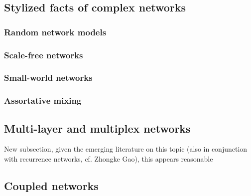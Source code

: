 	\subsection{Stylized facts of complex networks}
		\subsubsection{Random network models}
		\subsubsection{Scale-free networks}
		\subsubsection{Small-world networks}
		\subsubsection{Assortative mixing}

	\subsection{Multi-layer and multiplex networks}
	New subsection, given the emerging literature on this topic (also in conjunction with recurrence networks, cf. Zhongke Gao), this appears reasonable

	\subsection{Coupled networks}
    
